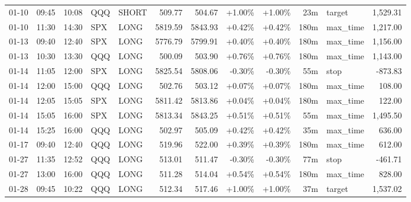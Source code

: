 \documentclass[11pt,a4paper]{article}
\begin{document}
\begin{center}
\begin{longtable}{>{\color{txtmain}}l l l l l r r r r r >{\color{txtmain}}l r}
01-10 & 09:45 & 10:08 & QQQ & SHORT & 509.77 & 504.67 & \textcolor{wingreen}{+1.00\%} & \textcolor{wingreen}{+1.00\%} & 23m & target & \textcolor{wingreen}{1,529.31} \\
01-10 & 11:30 & 14:30 & SPX & LONG & 5819.59 & 5843.93 & \textcolor{wingreen}{+0.42\%} & \textcolor{wingreen}{+0.42\%} & 180m & max\_time & \textcolor{wingreen}{1,217.00} \\
01-13 & 09:40 & 12:40 & SPX & LONG & 5776.79 & 5799.91 & \textcolor{wingreen}{+0.40\%} & \textcolor{wingreen}{+0.40\%} & 180m & max\_time & \textcolor{wingreen}{1,156.00} \\
01-13 & 10:30 & 13:30 & QQQ & LONG & 500.09 & 503.90 & \textcolor{wingreen}{+0.76\%} & \textcolor{wingreen}{+0.76\%} & 180m & max\_time & \textcolor{wingreen}{1,143.00} \\
01-14 & 11:05 & 12:00 & SPX & LONG & 5825.54 & 5808.06 & \textcolor{lossred}{-0.30\%} & \textcolor{lossred}{-0.30\%} & 55m & stop & \textcolor{lossred}{-873.83} \\
01-14 & 12:00 & 15:00 & QQQ & LONG & 502.76 & 503.12 & \textcolor{wingreen}{+0.07\%} & \textcolor{wingreen}{+0.07\%} & 180m & max\_time & \textcolor{wingreen}{108.00} \\
01-14 & 12:05 & 15:05 & SPX & LONG & 5811.42 & 5813.86 & \textcolor{wingreen}{+0.04\%} & \textcolor{wingreen}{+0.04\%} & 180m & max\_time & \textcolor{wingreen}{122.00} \\
01-14 & 15:05 & 16:00 & SPX & LONG & 5813.34 & 5843.25 & \textcolor{wingreen}{+0.51\%} & \textcolor{wingreen}{+0.51\%} & 55m & max\_time & \textcolor{wingreen}{1,495.50} \\
01-14 & 15:25 & 16:00 & QQQ & LONG & 502.97 & 505.09 & \textcolor{wingreen}{+0.42\%} & \textcolor{wingreen}{+0.42\%} & 35m & max\_time & \textcolor{wingreen}{636.00} \\
01-17 & 09:40 & 12:40 & QQQ & LONG & 519.96 & 522.00 & \textcolor{wingreen}{+0.39\%} & \textcolor{wingreen}{+0.39\%} & 180m & max\_time & \textcolor{wingreen}{612.00} \\
01-27 & 11:35 & 12:52 & QQQ & LONG & 513.01 & 511.47 & \textcolor{lossred}{-0.30\%} & \textcolor{lossred}{-0.30\%} & 77m & stop & \textcolor{lossred}{-461.71} \\
01-27 & 13:00 & 16:00 & QQQ & LONG & 511.28 & 514.04 & \textcolor{wingreen}{+0.54\%} & \textcolor{wingreen}{+0.54\%} & 180m & max\_time & \textcolor{wingreen}{828.00} \\
01-28 & 09:45 & 10:22 & QQQ & LONG & 512.34 & 517.46 & \textcolor{wingreen}{+1.00\%} & \textcolor{wingreen}{+1.00\%} & 37m & target & \textcolor{wingreen}{1,537.02} \\

\end{longtable}
\end{center}
\end{document}
